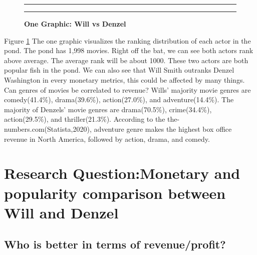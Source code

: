 \documentclass[]{article}
\begin{document}
\begin{figure}[!ht]
    \hrule
    \caption{ \textbf{One Graphic: Will vs Denzel} }
    \begin{center}
    \end{center}
    \label{fig:boxplot}
    \hrule
\end{figure}

\newpage

\noindent Figure \ref{fig:boxplot} The one graphic visualizes the
ranking distribution of each actor in the pond. The pond has 1,998
movies. Right off the bat, we can see both actors rank above average.
The average rank will be about 1000. These two actors are both popular
fish in the pond. We can also see that Will Smith outranks Denzel
Washington in every monetary metrics, this could be affected by many
things. Can genres of movies be correlated to revenue? Wills' majority
movie genres are comedy(41.4\%), drama(39.6\%), action(27.0\%), and
adventure(14.4\%). The majority of Denzels' movie genres are
drama(70.5\%), crime(34.4\%), action(29.5\%), and thriller(21.3\%).
According to the the-numbers.com(Statista,2020), adventure genre makes
the highest box office revenue in North America, followed by action,
drama, and comedy. \vspace{0.25in}

\section{Research Question:Monetary and popularity comparison between Will and Denzel}
\label{sec:rq}

\subsection{Who is better in terms of revenue/profit?}
\label{sec:rq2}
\end{document}
